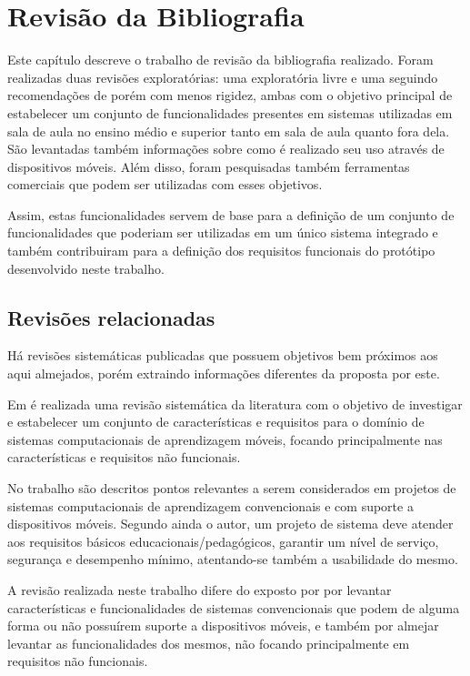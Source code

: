 \chapter{Revisão da Bibliografia}
\label{chap:revisao}

Este capítulo descreve o trabalho de revisão da bibliografia realizado. Foram realizadas duas revisões exploratórias: uma exploratória livre e uma seguindo recomendações de  porém com menos rigidez, ambas com o objetivo principal de estabelecer um conjunto de funcionalidades presentes em sistemas utilizadas em sala de aula no ensino médio e superior tanto em sala de aula quanto fora dela. São levantadas também informações sobre como é realizado seu uso através de dispositivos móveis. Além disso, foram pesquisadas também ferramentas comerciais que podem ser utilizadas com esses objetivos. 

Assim, estas funcionalidades servem de base para a definição de um conjunto de funcionalidades que poderiam ser utilizadas em um único sistema integrado e também contribuiram para a definição dos requisitos funcionais do protótipo desenvolvido neste trabalho.
 
\section{Revisões relacionadas}

Há revisões sistemáticas publicadas que possuem objetivos bem próximos aos aqui almejados, porém extraindo informações diferentes da proposta por este.

Em  é realizada uma revisão sistemática da literatura com o objetivo de investigar e estabelecer um conjunto de características e requisitos para o domínio de sistemas computacionais de aprendizagem móveis, focando principalmente nas características e requisitos não funcionais.

No trabalho são descritos pontos relevantes a serem considerados em projetos de sistemas computacionais de aprendizagem convencionais e com suporte a dispositivos móveis. Segundo ainda o autor, um projeto de sistema deve atender aos requisitos básicos educacionais/pedagógicos, garantir um nível de serviço, segurança e desempenho mínimo, atentando-se também a usabilidade do mesmo.

A revisão realizada neste trabalho difere do exposto por  por levantar características e funcionalidades de sistemas convencionais que podem de alguma forma ou não possuírem suporte a dispositivos móveis, e também por almejar levantar as funcionalidades dos mesmos, não focando principalmente em requisitos não funcionais.

